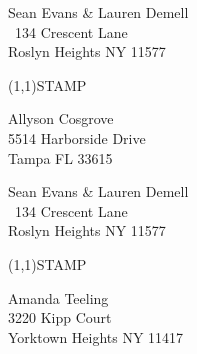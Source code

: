\documentclass[12pt]{article}
\begin{document}
\clearpage

\begin{minipage}{.5\linewidth} \noindent
Sean Evans \& Lauren Demell\\\ 
134 Crescent Lane\\ 
Roslyn Heights NY 11577
\end{minipage}
\begin{minipage}{.5\linewidth \hspace{-.2in} \vspace{-.3in}}
\begin{flushright}
\framebox(1,1){STAMP}
\end{flushright}
\end{minipage}

\begin{center} \begin{Huge} \vspace*{\fill}
Allyson Cosgrove\\
5514 Harborside Drive\\
Tampa FL 33615\\
\vspace{\fill} \end{Huge} \end{center}

\clearpage

\begin{minipage}{.5\linewidth} \noindent
Sean Evans \& Lauren Demell\\\ 
134 Crescent Lane\\ 
Roslyn Heights NY 11577
\end{minipage}
\begin{minipage}{.5\linewidth \hspace{-.2in} \vspace{-.3in}}
\begin{flushright}
\framebox(1,1){STAMP}
\end{flushright}
\end{minipage}

\begin{center} \begin{Huge} \vspace*{\fill}
Amanda Teeling\\
3220 Kipp Court\\
Yorktown Heights NY 11417\\
\vspace{\fill} \end{Huge} \end{center}
\end{document}
